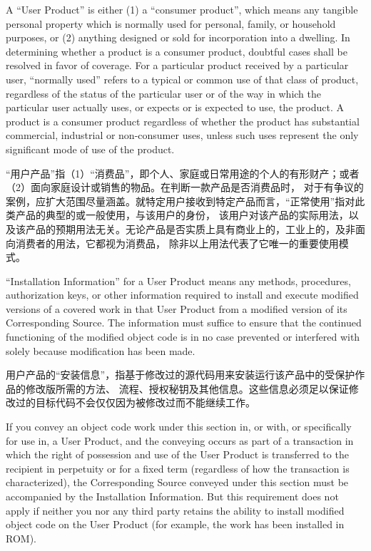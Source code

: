 \documentclass[11pt]{article}
\begin{document}
\begin{enumerate}
A ``User Product'' is either (1) a ``consumer product'', which means any
tangible personal property which is normally used for personal, family,
or household purposes, or (2) anything designed or sold for incorporation
into a dwelling.  In determining whether a product is a consumer product,
doubtful cases shall be resolved in favor of coverage.  For a particular
product received by a particular user, ``normally used'' refers to a
typical or common use of that class of product, regardless of the status
of the particular user or of the way in which the particular user
actually uses, or expects or is expected to use, the product.  A product
is a consumer product regardless of whether the product has substantial
commercial, industrial or non-consumer uses, unless such uses represent
the only significant mode of use of the product.

“用户产品”指（1）“消费品”，即个人、家庭或日常用途的个人的有形财产；或者（2）面向家庭设计或销售的物品。在判断一款产品是否消费品时，
对于有争议的案例，应扩大范围尽量涵盖。就特定用户接收到特定产品而言，“正常使用”指对此类产品的典型的或一般使用，与该用户的身份，
该用户对该产品的实际用法，以及该产品的预期用法无关。无论产品是否实质上具有商业上的，工业上的，及非面向消费者的用法，它都视为消费品，
除非以上用法代表了它唯一的重要使用模式。


``Installation Information'' for a User Product means any methods,
procedures, authorization keys, or other information required to install
and execute modified versions of a covered work in that User Product from
a modified version of its Corresponding Source.  The information must
suffice to ensure that the continued functioning of the modified object
code is in no case prevented or interfered with solely because
modification has been made.

用户产品的“安装信息”，指基于修改过的源代码用来安装运行该产品中的受保护作品的修改版所需的方法、
流程、授权秘钥及其他信息。这些信息必须足以保证修改过的目标代码不会仅仅因为被修改过而不能继续工作。

If you convey an object code work under this section in, or with, or
specifically for use in, a User Product, and the conveying occurs as
part of a transaction in which the right of possession and use of the
User Product is transferred to the recipient in perpetuity or for a
fixed term (regardless of how the transaction is characterized), the
Corresponding Source conveyed under this section must be accompanied
by the Installation Information.  But this requirement does not apply
if neither you nor any third party retains the ability to install
modified object code on the User Product (for example, the work has
been installed in ROM).


\end{enumerate}
\end{document}
